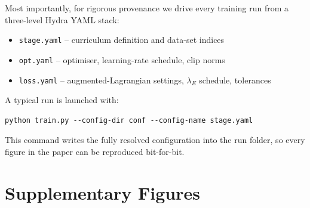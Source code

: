 \documentclass{article}
\begin{document}
\begin{sloppypar}
Most importantly, for rigorous provenance we drive every training run from a
three-level Hydra YAML stack:
\end{sloppypar}

\begin{itemize}
    \item \texttt{stage.yaml} – curriculum definition and data-set indices\\
    \item \texttt{opt.yaml} – optimiser, learning-rate schedule, clip norms\\
    \item \texttt{loss.yaml} – augmented-Lagrangian settings, $\lambda_E$ schedule, 
    tolerances
\end{itemize}

A typical run is launched with:

\begin{verbatim}
python train.py --config-dir conf --config-name stage.yaml
\end{verbatim}

This command writes the fully resolved configuration into the run folder, so every figure in the paper can be reproduced bit-for-bit.


\appendix
\section{Supplementary Figures}
\end{document}
